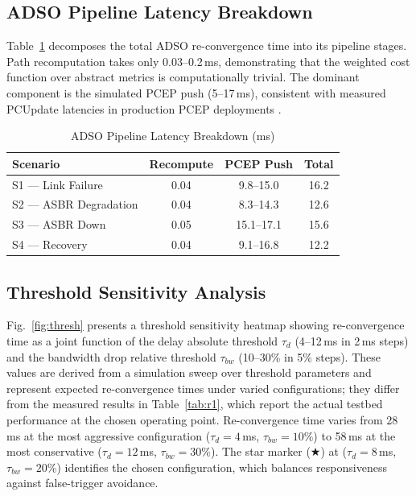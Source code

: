 \documentclass[conference]{IEEEtran}
\begin{document}
\subsection{ADSO Pipeline Latency Breakdown}

Table~\ref{tab:pipeline} decomposes the total ADSO re-convergence time
into its pipeline stages. Path recomputation takes only 0.03--0.2\,ms,
demonstrating that the weighted cost function over abstract metrics is
computationally trivial. The dominant component is the simulated PCEP
push (5--17\,ms), consistent with measured PCUpdate latencies in
production PCEP deployments \cite{b_pce_sr}.

\begin{table}[htbp]
\caption{ADSO Pipeline Latency Breakdown (ms)}
\label{tab:pipeline}
\begin{center}
\renewcommand{\arraystretch}{1.25}
\begin{tabular}{|l|c|c|c|}
\hline
\textbf{Scenario} &
  \textbf{Recompute} &
  \textbf{PCEP Push} &
  \textbf{Total} \\
\hline
S1 --- Link Failure     & 0.04 & 9.8--15.0  & 16.2 \\
S2 --- ASBR Degradation & 0.04 & 8.3--14.3  & 12.6 \\
S3 --- ASBR Down        & 0.05 & 15.1--17.1 & 15.6 \\
S4 --- Recovery          & 0.04 & 9.1--16.8  & 12.2 \\
\hline
\end{tabular}
\end{center}
\end{table}

\subsection{Threshold Sensitivity Analysis}

Fig.~\ref{fig:thresh} presents a threshold sensitivity heatmap showing
re-convergence time as a joint function of the delay absolute threshold
$\tau_d$ (4--12\,ms in 2\,ms steps) and the bandwidth drop relative
threshold $\tau_{bw}$ (10--30\% in 5\% steps). These values are
derived from a simulation sweep over threshold parameters and represent
expected re-convergence times under varied configurations; they differ
from the measured results in Table~\ref{tab:r1}, which report the
actual testbed performance at the chosen operating point.
Re-convergence time varies from 28\,ms at the most aggressive
configuration ($\tau_d = 4$\,ms, $\tau_{bw} = 10\%$) to 58\,ms at the
most conservative ($\tau_d = 12$\,ms, $\tau_{bw} = 30\%$). The star
marker ($\bigstar$) at ($\tau_d = 8$\,ms, $\tau_{bw} = 20\%$)
identifies the chosen configuration, which balances responsiveness
against false-trigger avoidance.
\end{document}
